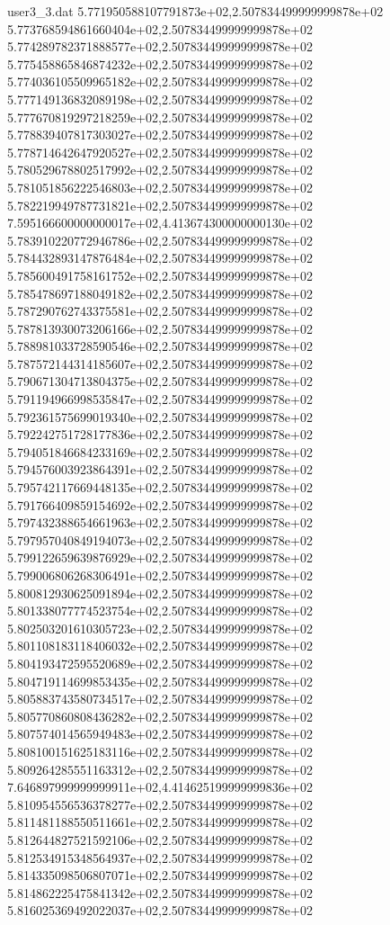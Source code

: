 \begin{filecontents}{user3_3.dat}
5.771950588107791873e+02,2.507834499999999878e+02
5.773768594861660404e+02,2.507834499999999878e+02
5.774289782371888577e+02,2.507834499999999878e+02
5.775458865846874232e+02,2.507834499999999878e+02
5.774036105509965182e+02,2.507834499999999878e+02
5.777149136832089198e+02,2.507834499999999878e+02
5.777670819297218259e+02,2.507834499999999878e+02
5.778839407817303027e+02,2.507834499999999878e+02
5.778714642647920527e+02,2.507834499999999878e+02
5.780529678802517992e+02,2.507834499999999878e+02
5.781051856222546803e+02,2.507834499999999878e+02
5.782219949787731821e+02,2.507834499999999878e+02
7.595166600000000017e+02,4.413674300000000130e+02
5.783910220772946786e+02,2.507834499999999878e+02
5.784432893147876484e+02,2.507834499999999878e+02
5.785600491758161752e+02,2.507834499999999878e+02
5.785478697188049182e+02,2.507834499999999878e+02
5.787290762743375581e+02,2.507834499999999878e+02
5.787813930073206166e+02,2.507834499999999878e+02
5.788981033728590546e+02,2.507834499999999878e+02
5.787572144314185607e+02,2.507834499999999878e+02
5.790671304713804375e+02,2.507834499999999878e+02
5.791194966998535847e+02,2.507834499999999878e+02
5.792361575699019340e+02,2.507834499999999878e+02
5.792242751728177836e+02,2.507834499999999878e+02
5.794051846684233169e+02,2.507834499999999878e+02
5.794576003923864391e+02,2.507834499999999878e+02
5.795742117669448135e+02,2.507834499999999878e+02
5.791766409859154692e+02,2.507834499999999878e+02
5.797432388654661963e+02,2.507834499999999878e+02
5.797957040849194073e+02,2.507834499999999878e+02
5.799122659639876929e+02,2.507834499999999878e+02
5.799006806268306491e+02,2.507834499999999878e+02
5.800812930625091894e+02,2.507834499999999878e+02
5.801338077774523754e+02,2.507834499999999878e+02
5.802503201610305723e+02,2.507834499999999878e+02
5.801108183118406032e+02,2.507834499999999878e+02
5.804193472595520689e+02,2.507834499999999878e+02
5.804719114699853435e+02,2.507834499999999878e+02
5.805883743580734517e+02,2.507834499999999878e+02
5.805770860808436282e+02,2.507834499999999878e+02
5.807574014565949483e+02,2.507834499999999878e+02
5.808100151625183116e+02,2.507834499999999878e+02
5.809264285551163312e+02,2.507834499999999878e+02
7.646897999999999911e+02,4.414625199999999836e+02
5.810954556536378277e+02,2.507834499999999878e+02
5.811481188550511661e+02,2.507834499999999878e+02
5.812644827521592106e+02,2.507834499999999878e+02
5.812534915348564937e+02,2.507834499999999878e+02
5.814335098506807071e+02,2.507834499999999878e+02
5.814862225475841342e+02,2.507834499999999878e+02
5.816025369492022037e+02,2.507834499999999878e+02

\end{filecontents}
